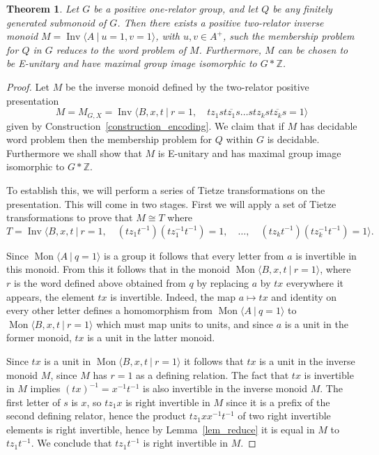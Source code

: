 \documentclass{amsart}
\newcommand{\Mpres}[2]{\operatorname{Mon}\bigl\langle #1\:|\:#2 \bigr\rangle}
\newcommand{\Ipres}[2]{\operatorname{Inv}\bigl\langle #1\:|\:#2 \bigr\rangle}
\theoremstyle{plain}
\newtheorem{theorem}{Theorem}[section]
\theoremstyle{definition}
\begin{document}
\begin{theorem}\label{thm_PosTwoRelatorGeneral} 
Let $G$ be a positive one-relator group, and let $Q$ be any finitely generated submonoid of $G$. Then there exists a positive two-relator inverse monoid $M=\Ipres{A}{u=1, v=1}$, with $u, v \in A^+$, such 
the membership problem for $Q$ in $G$ reduces to 
the word problem of $M$. 
Furthermore, $M$ can be chosen to be E-unitary and have maximal group image isomorphic to  
$G \ast \mathbb{Z}$. 
\end{theorem}
\begin{proof} 
Let $M$ be the inverse monoid defined by the two-relator positive presentation  
\[
M = M_{G,X} = \Ipres{B,x,t}{
r = 1, \quad 
t z_1 s t\overline{z_1} s  \ldots  s t z_k s t\overline{z_k} s = 1
}
\]
given by Construction~\ref{construction_encoding}. 
We claim that if $M$ has decidable word problem then the membership problem for $Q$ within $G$ is decidable.     
Furthermore we shall show that $M$ is E-unitary and has maximal group image isomorphic to $G \ast \mathbb{Z}$.   


To establish this,  
we will perform a series of Tietze transformations on the presentation. 
This will come in two stages. 
First we will apply a set of Tietze transformations to prove that  
$M \cong T$ where 
\[
T = \Ipres{B,x,t}{
r= 1, \quad 
(t z_1 t^{-1}) (t z_1^{-1} t^{-1}) = 1, \quad 
\ldots, \quad  
(t z_k t^{-1}) (t z_k^{-1} t^{-1}) = 1
}.
\]

Since $\Mpres{A}{q=1}$ is a group it follows that every letter from $a$ is invertible in this monoid. From this it follows that in the monoid $\Mpres{B,x,t}{r=1}$, where $r$ is the word defined above obtained from $q$ by replacing $a$ by $tx$ everywhere it appears, the element $tx$ is invertible. 
Indeed, the map $a \mapsto tx$ 
and identity on every other letter 
defines a homomorphism from $\Mpres{A}{q=1}$ to $\Mpres{B,x,t}{r=1}$ which must map units to units, and since $a$ is a unit in the former monoid, $tx$ is a unit in the latter monoid.    


Since $tx$ is a unit in $\Mpres{B,x,t}{r=1}$ it follows that $tx$ is a unit in the inverse monoid $M$, since $M$ has $r=1$ as a defining relation.
The fact that $tx$ is invertible in $M$ implies $(tx)^{-1} = x^{-1} t^{-1}$ is also invertible in the inverse monoid $M$. 
The first letter of $s$ is $x$, so $t z_1 x$ is right invertible in $M$ since it is a prefix of the second defining relator, hence the product $t z_1 xx^{-1} t^{-1} $ of two right invertible elements is right invertible, hence by Lemma~\ref{lem_reduce} it is equal in $M$ to $t z_1 t^{-1} $. We conclude that $t z_1 t^{-1} $ is right invertible in $M$.


\end{proof}
\end{document}
